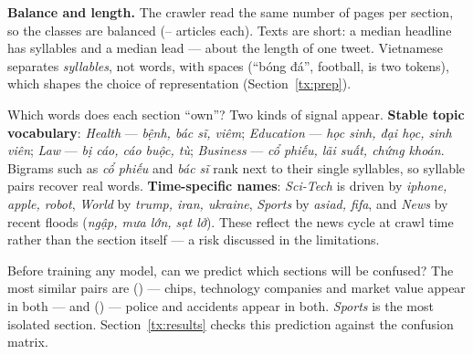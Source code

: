 \textbf{Balance and length.} The crawler read the same number of pages per section, so the classes are balanced
(\TXClassMin{}–\TXClassMax{} articles each). Texts are short: a median headline has \TXMedTitle{} syllables and a median
lead \TXMedDesc{} — about the length of one tweet. Vietnamese separates \emph{syllables}, not words, with spaces
(``bóng đá'', football, is two tokens), which shapes the choice of representation (Section~\ref{tx:prep}).

\begin{table}[H]\centering\small
\caption{The eight n-grams most over-represented in each section (χ² test of each TF-IDF 1–2-gram, section vs.\ rest, training set).\label{tx:tab-terms}}

\end{table}
\begin{finding}
\Q Which words does each section ``own''?
\F Two kinds of signal appear. \textbf{Stable topic vocabulary}: \emph{Health} — \textit{bệnh, bác sĩ, viêm}; \emph{Education}
— \textit{học sinh, đại học, sinh viên}; \emph{Law} — \textit{bị cáo, cáo buộc, tù}; \emph{Business} — \textit{cổ phiếu, lãi
suất, chứng khoán}. Bigrams such as \textit{cổ phiếu} and \textit{bác sĩ} rank next to their single syllables, so syllable
pairs recover real words. \textbf{Time-specific names}: \emph{Sci-Tech} is driven by \textit{iphone, apple, robot},
\emph{World} by \textit{trump, iran, ukraine}, \emph{Sports} by \textit{asiad, fifa}, and \emph{News} by recent floods
(\textit{ngập, mưa lớn, sạt lở}). These reflect the news cycle at crawl time rather than the section itself — a risk
discussed in the limitations.
\end{finding}

\begin{finding}
\Q Before training any model, can we predict which sections will be confused?
\F The most similar pairs are \textbf{\TXSimOnePair{}} (\TXSimOne) — chips, technology companies and market value appear in
both — and \textbf{\TXSimTwoPair{}} (\TXSimTwo) — police and accidents appear in both. \emph{Sports} is the most isolated
section. Section~\ref{tx:results} checks this prediction against the confusion matrix.
\end{finding}

